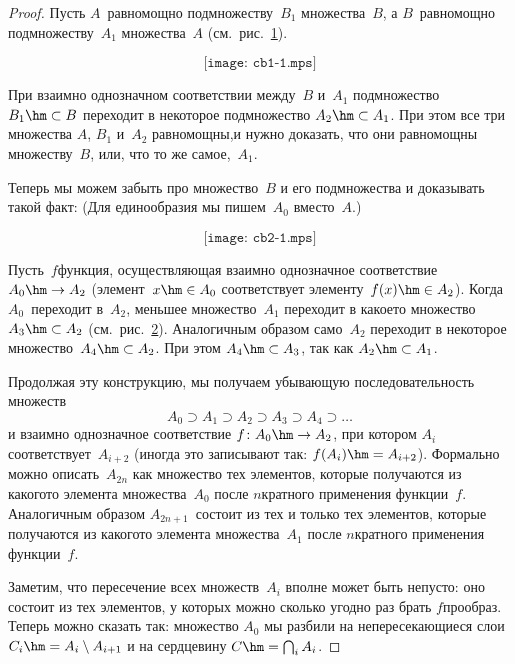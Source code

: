 \begin{proof}
Пусть $A$~равномощно подмножеству~$B_1$ множества~$B$, а
$B$~равномощно подмножеству~$A_1$ множества~$A$ (см.~рис.~\ref{cb-1}).
\begin{figure}[ht]
        $$
\texttt{[image: cb1-1.mps]}
        $$
\caption{}
\label{cb-1}
\end{figure}
При
взаимно однозначном соответствии между~$B$ и~$A_1$
подмножество $B_1\hm\subset B$ переходит в некоторое
подмножество $A_2\hm\subset A_1$. При этом все три множества
$A$, $B_1$ и~$A_2$ равномощны,\т и нужно доказать, что они
равномощны множеству~$B$, или, что то же самое,~$A_1$.

Теперь мы можем забыть про множество~$B$ и его подмножества
и доказывать такой факт:
\noindent
(Для единообразия мы пишем~$A_0$ вместо~$A$.)

\begin{figure}[ht]
        $$
\texttt{[image: cb2-1.mps]}
        $$
\caption{}
\label{cb-2}
\end{figure}

Пусть~$f$\т функция, осуществляющая взаимно однозначное
соответствие $A_0\hm\to A_2$ (элемент~$x\hm\in A_0$
соответствует элементу~$f(x)\hm\in A_2$). Когда $A_0$~переходит
в~$A_2$, меньшее множество~$A_1$ переходит в какое\д то
множество $A_3\hm\subset A_2$ (см.~рис.~\ref{cb-2}). Аналогичным
образом само~$A_2$ переходит в некоторое
множество~$A_4\hm\subset A_2$. При этом $A_4\hm\subset A_3$, так
как $A_2\hm\subset A_1$.

Продолжая эту конструкцию, мы получаем убывающую
последовательность множеств
        $$
A_0 \supset A_1 \supset A_2 \supset A_3 \supset A_4 \supset\ldots
        $$
и взаимно однозначное соответствие $f\colon A_0\hm\to A_2$, при
котором $A_i$ соответствует~$A_{i+2}$ (иногда это записывают так:
$f(A_i)\hm=A_{i+2}$). Формально можно описать~$A_{2n}$ как
множество тех элементов, которые получаются из какого\д то
элемента множества~$A_0$ после $n$\д кратного применения
функции~$f$. Аналогичным образом $A_{2n+1}$~состоит из тех и
только тех элементов, которые получаются из какого\д то элемента
множества~$A_1$ после $n$\д кратного применения функции~$f$.

Заметим, что пересечение всех множеств~$A_i$ вполне может быть
непусто: оно состоит из тех элементов, у которых
можно сколько угодно раз брать $f$\д прообраз. Теперь можно сказать так:
множество $A_0$ мы разбили на непересекающиеся слои
$C_i\hm=A_i\setminus A_{i+1}$ и на сердцевину $C\hm=\bigcap_{i}
A_i$.


\end{proof}
